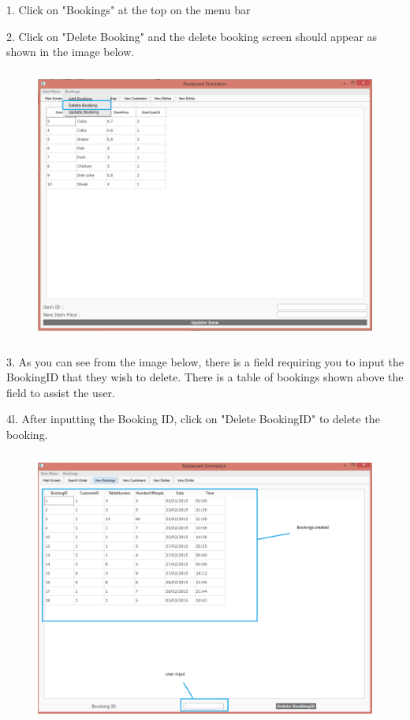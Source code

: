 1. Click on "Bookings" at the top on the menu bar

2. Click on "Delete Booking" and the delete booking screen should appear as shown in the image below.

\begin{figure}[H]
    \includegraphics[height = 9cm]{./Manual/images/DeleteBooking1} 
    \caption{} \label{fig:deletebooking1}
\end{figure}

3. As you can see from the image below, there is a field requiring you to input the BookingID that they wish to delete. There is a table of bookings shown above the field to assist the user.

4l. After inputting the Booking ID, click on "Delete BookingID" to delete the booking.

\begin{figure}[H]
    \includegraphics[height = 9cm]{./Manual/images/DeleteBooking2} 
    \caption{} \label{fig:deletebooking2}
\end{figure}

